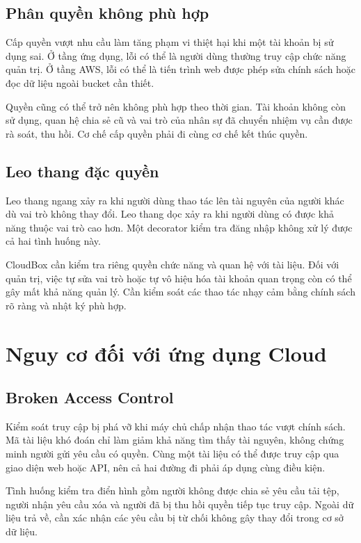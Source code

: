 \subsection{Phân quyền không phù hợp}
Cấp quyền vượt nhu cầu làm tăng phạm vi thiệt hại khi một tài khoản bị sử dụng sai. Ở tầng ứng dụng, lỗi có thể là người dùng thường truy cập chức năng quản trị. Ở tầng AWS, lỗi có thể là tiến trình web được phép sửa chính sách hoặc đọc dữ liệu ngoài bucket cần thiết.

Quyền cũng có thể trở nên không phù hợp theo thời gian. Tài khoản không còn sử dụng, quan hệ chia sẻ cũ và vai trò của nhân sự đã chuyển nhiệm vụ cần được rà soát, thu hồi. Cơ chế cấp quyền phải đi cùng cơ chế kết thúc quyền.
\subsection{Leo thang đặc quyền}
Leo thang ngang xảy ra khi người dùng thao tác lên tài nguyên của người khác dù vai trò không thay đổi. Leo thang dọc xảy ra khi người dùng có được khả năng thuộc vai trò cao hơn. Một decorator kiểm tra đăng nhập không xử lý được cả hai tình huống này.

CloudBox cần kiểm tra riêng quyền chức năng và quan hệ với tài liệu. Đối với quản trị, việc tự sửa vai trò hoặc tự vô hiệu hóa tài khoản quan trọng còn có thể gây mất khả năng quản lý. Cần kiểm soát các thao tác nhạy cảm bằng chính sách rõ ràng và nhật ký phù hợp.

\section{Nguy cơ đối với ứng dụng Cloud}
\subsection{Broken Access Control}
Kiểm soát truy cập bị phá vỡ khi máy chủ chấp nhận thao tác vượt chính sách. Mã tài liệu khó đoán chỉ làm giảm khả năng tìm thấy tài nguyên, không chứng minh người gửi yêu cầu có quyền. Cùng một tài liệu có thể được truy cập qua giao diện web hoặc API, nên cả hai đường đi phải áp dụng cùng điều kiện.

Tình huống kiểm tra điển hình gồm người không được chia sẻ yêu cầu tải tệp, người nhận yêu cầu xóa và người đã bị thu hồi quyền tiếp tục truy cập. Ngoài dữ liệu trả về, cần xác nhận các yêu cầu bị từ chối không gây thay đổi trong cơ sở dữ liệu.
